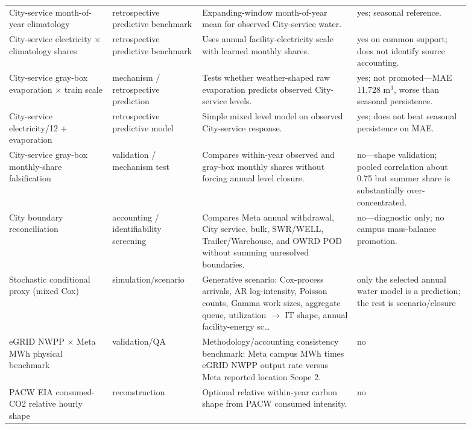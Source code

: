 \documentclass[11pt]{article}
\newcommand{\latesttxt}[1]{\textcolor{purple!85!black}{#1}}
\begin{document}
\begin{longtable}{@{}p{0.20\linewidth}p{0.17\linewidth}p{0.30\linewidth}p{0.22\linewidth}@{}}
\latesttxt{City-service month-of-year climatology} & \latesttxt{retrospective predictive benchmark} & \latesttxt{Expanding-window month-of-year mean for observed City-service water.} & \latesttxt{yes; seasonal reference.}\\
\latesttxt{City-service electricity $\times$ climatology shares} & \latesttxt{retrospective predictive benchmark} & \latesttxt{Uses annual facility-electricity scale with learned monthly shares.} & \latesttxt{yes on common support; does not identify source accounting.}\\
\latesttxt{City-service gray-box evaporation $\times$ train scale} & \latesttxt{mechanism / retrospective prediction} & \latesttxt{Tests whether weather-shaped raw evaporation predicts observed City-service levels.} & \latesttxt{yes; not promoted---MAE 11,728 m$^3$, worse than seasonal persistence.}\\
\latesttxt{City-service electricity/12 + evaporation} & \latesttxt{retrospective predictive model} & \latesttxt{Simple mixed level model on observed City-service response.} & \latesttxt{yes; does not beat seasonal persistence on MAE.}\\
\latesttxt{City-service gray-box monthly-share falsification} & \latesttxt{validation / mechanism test} & \latesttxt{Compares within-year observed and gray-box monthly shares without forcing annual level closure.} & \latesttxt{no---shape validation; pooled correlation about 0.75 but summer share is substantially over-concentrated.}\\
\latesttxt{City boundary reconciliation} & \latesttxt{accounting / identifiability screening} & \latesttxt{Compares Meta annual withdrawal, City service, bulk, SWR/WELL, Trailer/Warehouse, and OWRD POD without summing unresolved boundaries.} & \latesttxt{no---diagnostic only; no campus mass-balance promotion.}\\
Stochastic conditional proxy (mixed Cox) & simulation/scenario & Generative scenario: Cox-process arrivals, AR log-intensity, Poisson counts, Gamma work sizes, aggregate queue, utilization $\to$ IT shape, annual facility-energy sc\ldots & only the selected annual water model is a prediction; the rest is scenario/closure\\
eGRID NWPP $\times$ Meta MWh physical benchmark & validation/QA & Methodology/accounting consistency benchmark: Meta campus MWh times eGRID NWPP output rate versus Meta reported location Scope 2. & no\\
PACW EIA consumed-CO2 relative hourly shape & reconstruction & Optional relative within-year carbon shape from PACW consumed intensity. & no\\

\end{longtable}
\end{document}
